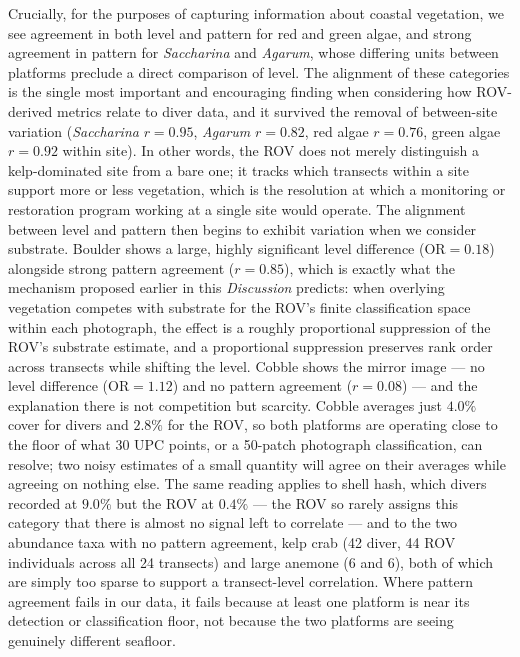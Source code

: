 \documentclass[11pt]{article}
\begin{document}
Crucially, for the purposes of capturing information about coastal vegetation,
we see agreement in both level and pattern for red and green algae, and strong
agreement in pattern for \textit{Saccharina} and \textit{Agarum}, whose
differing units between platforms preclude a direct comparison of level.
The alignment of these categories is the single most important and
encouraging finding when considering how ROV-derived metrics relate to diver
data, and it survived the removal of between-site variation
(\textit{Saccharina} $r=0.95$, \textit{Agarum} $r=0.82$, red algae $r=0.76$,
green algae $r=0.92$ within site).
In other words, the ROV does not merely distinguish a kelp-dominated site from
a bare one; it tracks which transects within a site support more or less
vegetation, which is the resolution at which a monitoring or restoration
program working at a single site would operate.
The alignment between level and pattern then begins to exhibit variation when 
we consider substrate.
Boulder shows a large, highly significant level difference
($\mathrm{OR}=0.18$) alongside strong pattern agreement ($r=0.85$), which is
exactly what the mechanism proposed earlier in this \textit{Discussion} predicts: when
overlying vegetation competes with substrate for the ROV's finite
classification space within each photograph, the effect is a roughly
proportional suppression of the ROV's substrate estimate, and a proportional
suppression preserves rank order across transects while shifting the level.
Cobble shows the mirror image --- no level difference ($\mathrm{OR}=1.12$) and
no pattern agreement ($r=0.08$) --- and the explanation there is not
competition but scarcity.
Cobble averages just $4.0\%$ cover for divers and $2.8\%$ for the ROV, so both
platforms are operating close to the floor of what 30 UPC points, or a
50-patch photograph classification, can resolve; two noisy estimates of a
small quantity will agree on their averages while agreeing on nothing else.
The same reading applies to shell hash, which divers recorded at $9.0\%$ but
the ROV at $0.4\%$ --- the ROV so rarely assigns this category that there is
almost no signal left to correlate --- and to the two abundance taxa with no
pattern agreement, kelp crab (42 diver, 44 ROV individuals across all 24
transects) and large anemone (6 and 6), both of which are simply too sparse to
support a transect-level correlation.
Where pattern agreement fails in our data, it fails because at least one
platform is near its detection or classification floor, not because the two
platforms are seeing genuinely different seafloor.
\end{document}
